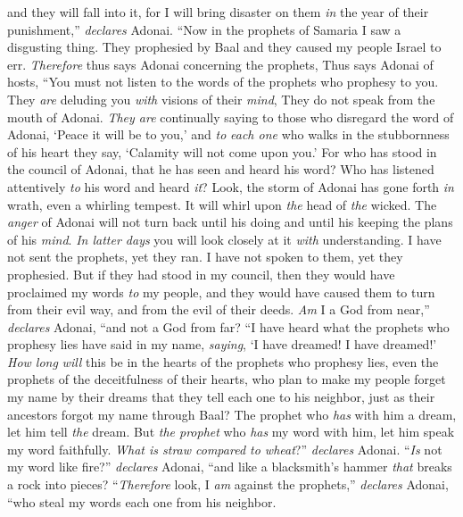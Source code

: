 \begin{biblechapter}
and they will fall into it, 
for I will bring disaster on them \textit{in} the year of their punishment,” \textit{declares} Adonai.
\verse “Now in the prophets of Samaria I saw a disgusting thing. 
They prophesied by Baal and they caused my people Israel to err.
\verse \textit{Therefore} thus says Adonai concerning the prophets,
\verse Thus says Adonai of hosts,
\verse “You must not listen to the words of the prophets who prophesy to you. 
They \textit{are} deluding you \textit{with} visions of their \textit{mind}, 
They do not speak from the mouth of Adonai.
\verse \textit{They are} continually saying to those who disregard the word of Adonai, 
‘Peace it will be to you,’ 
and \textit{to} \textit{each one} who walks in the stubbornness of his heart they say, 
‘Calamity will not come upon you.’
\verse For who has stood in the council of Adonai, 
that he has seen and heard his word? 
Who has listened attentively \textit{to} his word 
and heard \textit{it}?
\verse Look, the storm of Adonai has gone forth \textit{in} wrath, 
even a whirling tempest. 
It will whirl upon \textit{the} head of \textit{the} wicked.
\verse The \textit{anger} of Adonai will not turn back 
until his doing and until his keeping the plans of his \textit{mind}. 
\textit{In latter days} you will look closely at it \textit{with} understanding.
\verse I have not sent the prophets, yet they ran. 
I have not spoken to them, yet they prophesied.
\verse But if they had stood in my council, 
then they would have proclaimed my words \textit{to} my people, 
and they would have caused them to turn from their evil way, 
and from the evil of their deeds.
\verse \textit{Am} I a God from near,” \textit{declares} Adonai, 
“and not a God from far?
\verse “I have heard what the prophets who prophesy lies have said in my name, \textit{saying}, ‘I have dreamed! I have dreamed!’
\verse \textit{How long} \textit{will} this be in the hearts of the prophets who prophesy lies, even the prophets of the deceitfulness of their hearts,
\verse who plan to make my people forget my name by their dreams that they tell each one to his neighbor, just as their ancestors forgot my name through Baal?
\verse The prophet who \textit{has} with him a dream, let him tell \textit{the} dream. But \textit{the prophet} who \textit{has} my word with him, let him speak my word faithfully. \textit{What is straw compared to wheat}?” \textit{declares} Adonai.
\verse “\textit{Is} not my word like fire?” \textit{declares} Adonai, “and like a blacksmith’s hammer \textit{that} breaks a rock into pieces?
\verse “\textit{Therefore} look, I \textit{am} against the prophets,” \textit{declares} Adonai, “who steal my words each one from his neighbor.

\end{biblechapter}
